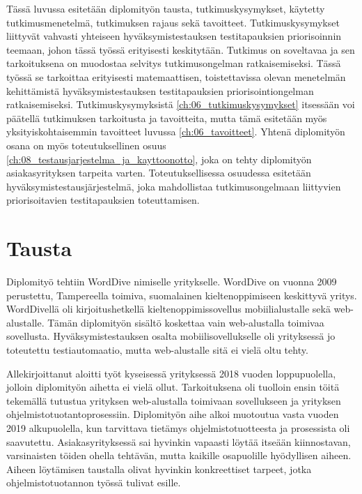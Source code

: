 Tässä luvussa esitetään diplomityön tausta, tutkimuskysymykset, käytetty tutkimusmenetelmä, tutkimuksen rajaus sekä tavoitteet.
Tutkimuskysymykset liittyvät vahvasti yhteiseen hyväksymistestauksen testitapauksien priorisoinnin teemaan, johon tässä työssä erityisesti keskitytään.
Tutkimus on soveltavaa ja sen tarkoituksena on muodostaa selvitys tutkimusongelman ratkaisemiseksi.
Tässä työssä se tarkoittaa erityisesti matemaattisen, toistettavissa olevan menetelmän kehittämistä hyväksymistestauksen testitapauksien priorisointiongelman ratkaisemiseksi.
Tutkimuskysymyksistä \ref{ch:06_tutkimuskysymykset} itsessään voi päätellä tutkimuksen tarkoitusta ja tavoitteita, mutta tämä esitetään myös yksityiskohtaisemmin tavoitteet luvussa \ref{ch:06_tavoitteet}.
Yhtenä diplomityön osana on myös toteutuksellinen osuus \ref{ch:08_testausjarjestelma_ja_kayttoonotto}, joka on tehty diplomityön asiakasyrityksen tarpeita varten.
Toteutuksellisessa osuudessa esitetään hyväksymistestausjärjestelmä, joka mahdollistaa tutkimusongelmaan liittyvien priorisoitavien testitapauksien toteuttamisen.

\section{Tausta} \label{ch:06_tausta}

  Diplomityö tehtiin WordDive nimiselle yritykselle. WordDive on vuonna 2009 perustettu, Tampereella toimiva, suomalainen kieltenoppimiseen keskittyvä yritys.
  WordDivellä oli kirjoitushetkellä kieltenoppimissovellus mobiilialustalle sekä web-alustalle.
  Tämän diplomityön sisältö koskettaa vain web-alustalla toimivaa sovellusta.
  Hyväksymistestauksen osalta mobiilisovellukselle oli yrityksessä jo toteutettu testiautomaatio, mutta web-alustalle sitä ei vielä oltu tehty.

  Allekirjoittanut aloitti työt kyseisessä yrityksessä 2018 vuoden loppupuolella, jolloin diplomityön aihetta ei vielä ollut.
  Tarkoituksena oli tuolloin ensin töitä tekemällä tutustua yrityksen web-alustalla toimivaan sovellukseen ja yrityksen ohjelmistotuotantoprosessiin.
  Diplomityön aihe alkoi muotoutua vasta vuoden 2019 alkupuolella, kun tarvittava tietämys ohjelmistotuotteesta ja prosessista oli saavutettu.
  Asiakasyrityksessä sai hyvinkin vapaasti löytää itseään kiinnostavan, varsinaisten töiden ohella tehtävän, mutta kaikille osapuolille hyödyllisen aiheen.
  Aiheen löytämisen taustalla olivat hyvinkin konkreettiset tarpeet, jotka ohjelmistotuotannon työssä tulivat esille.

